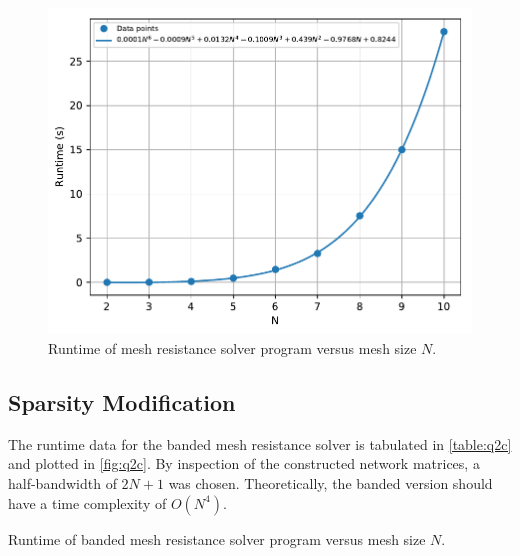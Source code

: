 \documentclass[a4paper,titlepage]{article}
\begin{document}
	\begin{figure}[!htb]
		\centering
		\includegraphics[width=\columnwidth]{plots/q2b.pdf}
		\caption
		{Runtime of mesh resistance solver program versus mesh size $N$.}
		\label{fig:q2b}
	\end{figure}
	
	\subsection{Sparsity Modification}
	
	The runtime data for the banded mesh resistance solver is tabulated in \autoref{table:q2c} and plotted in \autoref{fig:q2c}. By inspection of the constructed network matrices, a half-bandwidth of $2N + 1$ was chosen. Theoretically, the banded version should have a time complexity of $O(N^4)$.
	
	\begin{table}[!htb]
		\centering
		\caption{Runtime of banded mesh resistance solver program versus mesh size $N$.}
		\label{table:q2c}
	\end{table}
\end{document}
